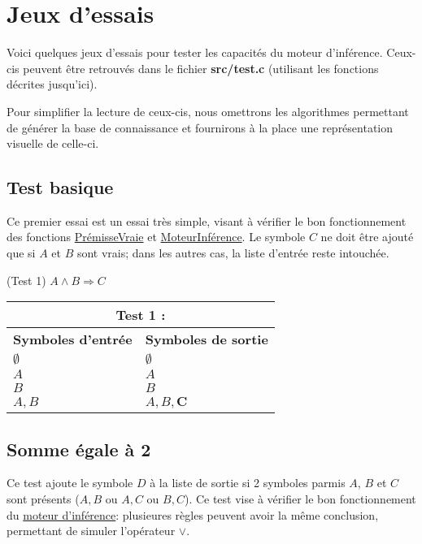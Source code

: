 \documentclass[12pt]{article}
\begin{document}
\newpage

\section{Jeux d'essais}


Voici quelques jeux d'essais pour tester les capacités du moteur d'inférence.
Ceux-cis peuvent être retrouvés dans le fichier \textbf{src/test.c} (utilisant les fonctions décrites jusqu'ici).

Pour simplifier la lecture de ceux-cis, nous omettrons les algorithmes permettant de générer la base de connaissance et fournirons à la place une représentation visuelle de celle-ci.

\subsection{Test basique}

Ce premier essai est un essai très simple, visant à vérifier le bon fonctionnement des fonctions \hyperref[PV]{PrémisseVraie} et \hyperref[MI]{MoteurInférence}.
Le symbole $C$ ne doit être ajouté que si $A$ et $B$ sont vrais; dans les autres cas, la liste d'entrée reste intouchée.

\begin{algorithm}
\BeginKB(Test 1\label{T1}){
  $A \land B \Rightarrow C$
}
\end{algorithm}

\begin{tabular}{|p{4cm}|p{6.5cm}|}
  \hline
  \multicolumn{2}{|c|}{\textbf{Test 1 :}} \\
  \hline
  \textbf{Symboles d'entrée} & \textbf{Symboles de sortie} \\
  \hline
  $\emptyset$ & $\emptyset$ \\
  \hline
  $A$ & $A$ \\
  \hline
  $B$ & $B$ \\
  \hline
  $A, B$ & $A, B, \mathbf{C}$ \\
  \hline
\end{tabular}

\subsection{Somme égale à 2}

Ce test ajoute le symbole $D$ à la liste de sortie si 2 symboles parmis $A$, $B$ et $C$ sont présents ($A, B$ ou $A, C$ ou $B, C$).
Ce test vise à vérifier le bon fonctionnement du \hyperref[MI]{moteur d'inférence}: plusieures règles peuvent avoir la même conclusion, permettant de simuler l'opérateur $\lor$.
\end{document}
